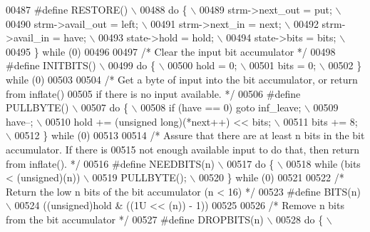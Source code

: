 \begin{DoxyCode}
{{{{00487 \textcolor{preprocessor}{#define RESTORE() \(\backslash\)}
00488 \textcolor{preprocessor}{    do \{ \(\backslash\)}
00489 \textcolor{preprocessor}{        strm->next\_out = put; \(\backslash\)}
00490 \textcolor{preprocessor}{        strm->avail\_out = left; \(\backslash\)}
00491 \textcolor{preprocessor}{        strm->next\_in = next; \(\backslash\)}
00492 \textcolor{preprocessor}{        strm->avail\_in = have; \(\backslash\)}
00493 \textcolor{preprocessor}{        state->hold = hold; \(\backslash\)}
00494 \textcolor{preprocessor}{        state->bits = bits; \(\backslash\)}
00495 \textcolor{preprocessor}{    \} while (0)}
00496 
00497 \textcolor{comment}{/* Clear the input bit accumulator */}
00498 \textcolor{preprocessor}{#define INITBITS() \(\backslash\)}
00499 \textcolor{preprocessor}{    do \{ \(\backslash\)}
00500 \textcolor{preprocessor}{        hold = 0; \(\backslash\)}
00501 \textcolor{preprocessor}{        bits = 0; \(\backslash\)}
00502 \textcolor{preprocessor}{    \} while (0)}
00503 
00504 \textcolor{comment}{/* Get a byte of input into the bit accumulator, or return from inflate()}
00505 \textcolor{comment}{   if there is no input available. */}
00506 \textcolor{preprocessor}{#define PULLBYTE() \(\backslash\)}
00507 \textcolor{preprocessor}{    do \{ \(\backslash\)}
00508 \textcolor{preprocessor}{        if (have == 0) goto inf\_leave; \(\backslash\)}
00509 \textcolor{preprocessor}{        have--; \(\backslash\)}
00510 \textcolor{preprocessor}{        hold += (unsigned long)(*next++) << bits; \(\backslash\)}
00511 \textcolor{preprocessor}{        bits += 8; \(\backslash\)}
00512 \textcolor{preprocessor}{    \} while (0)}
00513 
00514 \textcolor{comment}{/* Assure that there are at least n bits in the bit accumulator.  If there is}
00515 \textcolor{comment}{   not enough available input to do that, then return from inflate(). */}
00516 \textcolor{preprocessor}{#define NEEDBITS(n) \(\backslash\)}
00517 \textcolor{preprocessor}{    do \{ \(\backslash\)}
00518 \textcolor{preprocessor}{        while (bits < (unsigned)(n)) \(\backslash\)}
00519 \textcolor{preprocessor}{            PULLBYTE(); \(\backslash\)}
00520 \textcolor{preprocessor}{    \} while (0)}
00521 
00522 \textcolor{comment}{/* Return the low n bits of the bit accumulator (n < 16) */}
00523 \textcolor{preprocessor}{#define BITS(n) \(\backslash\)}
00524 \textcolor{preprocessor}{    ((unsigned)hold & ((1U << (n)) - 1))}
00525 
00526 \textcolor{comment}{/* Remove n bits from the bit accumulator */}
00527 \textcolor{preprocessor}{#define DROPBITS(n) \(\backslash\)}
00528 \textcolor{preprocessor}{    do \{ \(\backslash\)}
}}}}
\end{DoxyCode}
